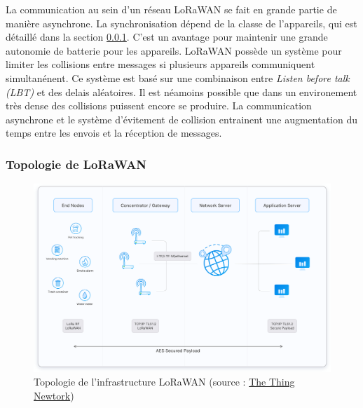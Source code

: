 \vspace{0.1cm}

La communication au sein d'un réseau LoRaWAN se fait en grande partie de manière asynchrone. La synchronisation dépend de la classe de l'appareils, qui est détaillé dans la section \ref{topolora}. C'est un avantage pour maintenir une grande autonomie de batterie pour les appareils. LoRaWAN possède un système pour limiter les collisions entre messages si plusieurs appareils communiquent simultanénent. Ce système est basé sur une combinaison entre \textit{Listen before talk (LBT)} et des delais aléatoires\cite{loracolision}. Il est néamoins possible que dans un environement très dense des collisions puissent encore se produire. La communication asynchrone et le système d'évitement de collision entrainent une augmentation du temps entre les envois et la réception de messages.

\subsubsection{Topologie de LoRaWAN}\label{topolora}

\begin{figure}[h]
\centering

\includegraphics[scale=0.1]{images/architecture.png}
\caption{Topologie de l'infrastructure LoRaWAN (source : \href{https://www.thethingsnetwork.org/docs/lorawan/architecture/}{The Thing Newtork})}\label{term7}
\end{figure}

